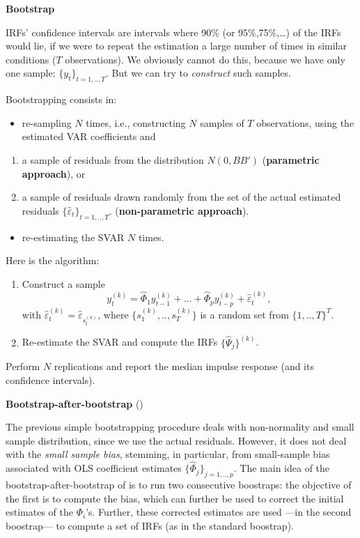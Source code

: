 \documentclass[
  12pt,
]{book}
\providecommand{\tightlist}{%
  \setlength{\itemsep}{0pt}\setlength{\parskip}{0pt}}
\theoremstyle{definition}
\theoremstyle{definition}
\theoremstyle{definition}
\theoremstyle{definition}
\theoremstyle{remark}
\begin{document}
\textbf{Bootstrap}

IRFs' confidence intervals are intervals where 90\% (or 95\%,75\%,\ldots) of the IRFs would lie, if we were to repeat the estimation a large number of times in similar conditions (\(T\) observations). We obviously cannot do this, because we have only one sample: \(\{y_t\}_{t=1,..,T}\). But we can try to \emph{construct} such samples.

Bootstrapping consists in:

\begin{itemize}
\tightlist
\item
  re-sampling \(N\) times, i.e., constructing \(N\) samples of \(T\) observations, using the estimated
  VAR coefficients and
\end{itemize}

\begin{enumerate}
\def\labelenumi{\alph{enumi}.}
\tightlist
\item
  a sample of residuals from the distribution \(N(0,BB')\) (\textbf{parametric approach}), or
\item
  a sample of residuals drawn randomly from the set of the actual estimated residuals \(\{\hat\varepsilon_t\}_{t=1,..,T}\). (\textbf{non-parametric approach}).
\end{enumerate}

\begin{itemize}
\tightlist
\item
  re-estimating the SVAR \(N\) times.
\end{itemize}

Here is the algorithm:

\begin{enumerate}
\def\labelenumi{\arabic{enumi}.}
\tightlist
\item
  Construct a sample
  \[
  y_t^{(k)}=\widehat{\Phi}_1 y_{t-1}^{(k)} + \dots + \widehat{\Phi}_p y_{t-p}^{(k)} + \hat\varepsilon_t^{(k)},
  \]
  with \(\hat\varepsilon_{t}^{(k)}=\hat\varepsilon_{s_t^{(k)}}\), where \(\{s_1^{(k)},..,s_T^{(k)}\}\) is a random set from \(\{1,..,T\}^T\).
\item
  Re-estimate the SVAR and compute the IRFs \(\{\widehat{\Psi}_j\}^{(k)}\).
\end{enumerate}

Perform \(N\) replications and report the median impulse response (and its confidence intervals).

\textbf{Bootstrap-after-bootstrap} (\citet{Kilian_1998})

The previous simple bootstrapping procedure deals with non-normality and small sample distribution, since we use the actual residuals. However, it does not deal with the \emph{small sample bias}, stemming, in particular, from small-sample bias associated with OLS coefficient estimates \(\{\widehat{\Phi}_j\}_{j=1,..,p}\). The main idea of the bootstrap-after-bootstrap of \citet{Kilian_1998} is to run two consecutive boostraps: the objective of the first is to compute the bias, which can further be used to correct the initial estimates of the \(\Phi_i\)'s. Further, these corrected estimates are used ---in the second boostrap--- to compute a set of IRFs (as in the standard boostrap).
\end{document}
